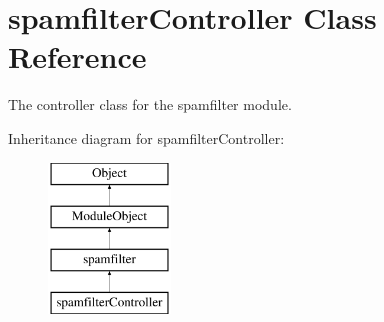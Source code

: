 \hypertarget{classspamfilterController}{}\section{spamfilter\+Controller Class Reference}
\label{classspamfilterController}


The controller class for the spamfilter module.  


Inheritance diagram for spamfilter\+Controller\+:\begin{figure}[H]
\begin{center}
\leavevmode
\includegraphics[height=4.000000cm]{classspamfilterController}
\end{center}
\end{figure}

